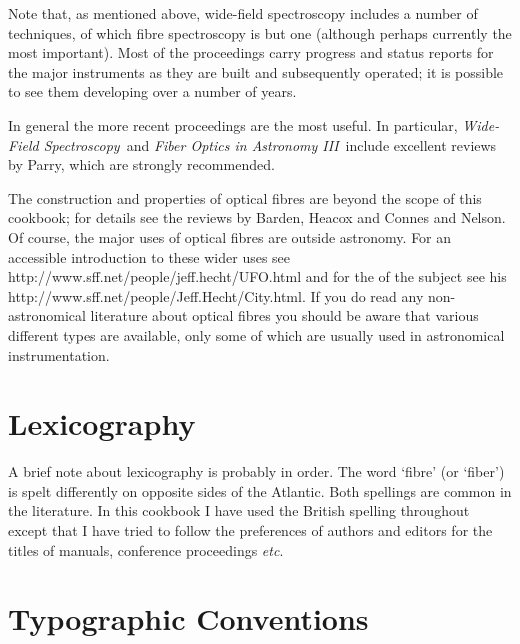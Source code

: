 \documentclass[twoside,11pt]{starlink}
\begin{document}
Note that, as mentioned above,  wide-field spectroscopy includes a number
of techniques, of which fibre spectroscopy is but one (although perhaps
currently the most important).  Most of the proceedings carry progress
and status reports for the major instruments as they are built and
subsequently operated; it is possible to see them developing over a number
of years.

In general the more recent proceedings are the most useful.  In
particular, \textit{Wide-Field Spectroscopy}\, and \textit{Fiber Optics in
Astronomy III}\, include excellent reviews by Parry\cite{PARRY97,
PARRY98}, which are strongly recommended.

The construction and properties of optical fibres are beyond the scope
of this cookbook; for details see the reviews by Barden\cite{BARDEN98},
Heacox and Connes\cite{HEACOX92} and Nelson\cite{NELSON88}.  Of course,
the major uses of optical fibres are outside astronomy.  For an
accessible introduction to these wider uses see
{http://www.sff.net/people/jeff.hecht/UFO.html}\/\cite{HECHT98}
and for the
of the subject see his
{http://www.sff.net/people/Jeff.Hecht/City.html}\/\cite{HECHT99}.
If you do read any non-astronomical literature about optical fibres
you should be aware that various different types are available, only
some of which are usually used in astronomical instrumentation.


\section{\label{LEX}Lexicography}

A brief note about lexicography is probably in order.  The word `fibre'
(or `fiber') is spelt differently on opposite sides of the Atlantic.
Both spellings are common in the literature.  In this cookbook I have
used the British spelling throughout except that I have tried
to follow the preferences of authors and editors for the titles of
manuals, conference proceedings \emph{etc}.


\section{\label{TYPO}Typographic Conventions}
\end{document}

